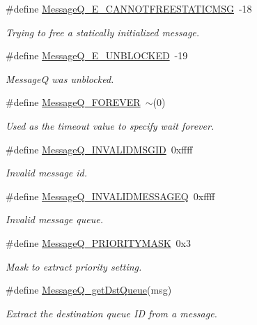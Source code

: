 \begin{DoxyCompactItemize}
\#define \hyperlink{_message_q_8h_a0802e8f4b461e84ddef5a8241432c00b}{Message\-Q\-\_\-\-E\-\_\-\-C\-A\-N\-N\-O\-T\-F\-R\-E\-E\-S\-T\-A\-T\-I\-C\-M\-S\-G}~-\/18
\begin{DoxyCompactList}\small\item\em Trying to free a statically initialized message. \end{DoxyCompactList}\item 
\#define \hyperlink{_message_q_8h_a320bbc58b6a523f70d9866a54d176b44}{Message\-Q\-\_\-\-E\-\_\-\-U\-N\-B\-L\-O\-C\-K\-E\-D}~-\/19
\begin{DoxyCompactList}\small\item\em Message\-Q was unblocked. \end{DoxyCompactList}\item 
\#define \hyperlink{_message_q_8h_a9218a5f44331562bea6284890689c2b5}{Message\-Q\-\_\-\-F\-O\-R\-E\-V\-E\-R}~$\sim$(0)
\begin{DoxyCompactList}\small\item\em Used as the timeout value to specify wait forever. \end{DoxyCompactList}\item 
\#define \hyperlink{_message_q_8h_a370a69d26238b17087490483350a0731}{Message\-Q\-\_\-\-I\-N\-V\-A\-L\-I\-D\-M\-S\-G\-I\-D}~0xffff
\begin{DoxyCompactList}\small\item\em Invalid message id. \end{DoxyCompactList}\item 
\#define \hyperlink{_message_q_8h_aa4a5fa703505bd746c9f954a2ffcd43e}{Message\-Q\-\_\-\-I\-N\-V\-A\-L\-I\-D\-M\-E\-S\-S\-A\-G\-E\-Q}~0xffff
\begin{DoxyCompactList}\small\item\em Invalid message queue. \end{DoxyCompactList}\item 
\#define \hyperlink{_message_q_8h_a3cde3037a7d7bd3a7cf4291b939200c8}{Message\-Q\-\_\-\-P\-R\-I\-O\-R\-I\-T\-Y\-M\-A\-S\-K}~0x3
\begin{DoxyCompactList}\small\item\em Mask to extract priority setting. \end{DoxyCompactList}\item 
\#define \hyperlink{_message_q_8h_a6e60f683b011d8c960790b1f395d092b}{Message\-Q\-\_\-get\-Dst\-Queue}(msg)
\begin{DoxyCompactList}\small\item\em Extract the destination queue I\-D from a message. \end{DoxyCompactList}\item 

\end{DoxyCompactItemize}
